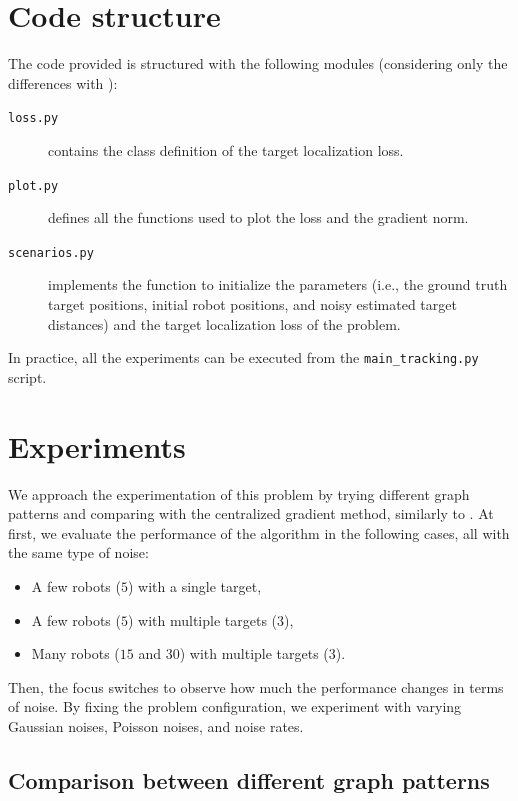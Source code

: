 \documentclass[a4paper,11pt,oneside]{book}
\begin{document}
\section{Code structure}
The code provided is structured with the following modules (considering only the differences with ):
\begin{description}
      \item[\texttt{loss.py}] contains the class definition of the target localization loss.
      \item[\texttt{plot.py}] defines all the functions used to plot the loss and the gradient norm.
      \item[\texttt{scenarios.py}] implements the function to initialize the parameters (i.e., the ground truth target positions, initial robot positions, and noisy estimated target distances) and the target localization loss of the problem.
\end{description}
In practice, all the experiments can be executed from the \texttt{main\_tracking.py} script.



\section{Experiments}

We approach the experimentation of this problem by trying different graph patterns and comparing with the centralized gradient method, similarly to . At first, we evaluate the performance of the algorithm in the following cases, all with the same type of noise:
\begin{itemize}
      \item A few robots ($5$) with a single target,
      \item A few robots ($5$) with multiple targets ($3$),
      \item Many robots ($15$ and $30$) with multiple targets ($3$).
\end{itemize}

Then, the focus switches to observe how much the performance changes in terms of noise. By fixing the problem configuration, we experiment with varying Gaussian noises, Poisson noises, and noise rates.


\subsection{Comparison between different graph patterns}
\end{document}
